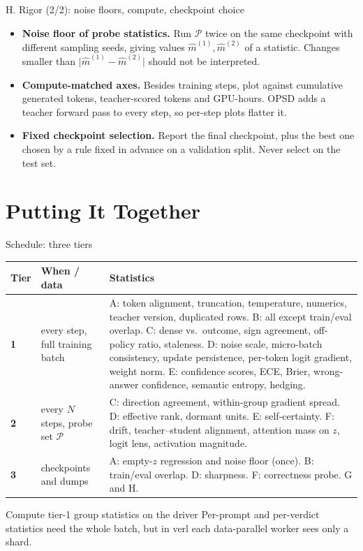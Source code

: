 \documentclass[aspectratio=169,11pt]{beamer}
\newcommand{\abs}[1]{\lvert #1\rvert}
\begin{document}
\begin{frame}{H. Rigor (2/2): noise floors, compute, checkpoint choice}
\begin{itemize}
  \item \textbf{Noise floor of probe statistics.} Run $\mathcal P$ twice on the same checkpoint with different sampling seeds, giving values $\hat m^{(1)},\hat m^{(2)}$ of a statistic. Changes smaller than $\abs{\hat m^{(1)}-\hat m^{(2)}}$ should not be interpreted.
  \item \textbf{Compute-matched axes.} Besides training steps, plot against cumulative generated tokens, teacher-scored tokens and GPU-hours. OPSD adds a teacher forward pass to every step, so per-step plots flatter it.
  \item \textbf{Fixed checkpoint selection.} Report the final checkpoint, plus the best one chosen by a rule fixed in advance on a validation split. Never select on the test set.
\end{itemize}
\end{frame}

\section{Putting It Together}

\begin{frame}{Schedule: three tiers}
\scriptsize
\setlength{\tabcolsep}{4pt}\renewcommand{\arraystretch}{1.15}
\begin{tabularx}{\linewidth}{@{}>{\bfseries}l >{\raggedright\arraybackslash}p{2.4cm} Y@{}}
\toprule
Tier & When / data & Statistics\\
 & every step, full training batch & A: token alignment, truncation, temperature, numerics, teacher version, duplicated rows.
B: all except train/eval overlap. C: dense vs.\ outcome, sign agreement, off-policy ratio, staleness.
D: noise scale, micro-batch consistency, update persistence, per-token logit gradient, weight norm.
E: confidence scores, ECE, Brier, wrong-answer confidence, semantic entropy, hedging.\\
2 & every $N$ steps, probe set $\mathcal P$ & C: direction agreement, within-group gradient spread. D: effective rank, dormant units.
E: self-certainty. F: drift, teacher--student alignment, attention mass on $z$, logit lens, activation magnitude.\\
3 & checkpoints and dumps & A: empty-$z$ regression and noise floor (once). B: train/eval overlap. D: sharpness. F: correctness probe. G and H.\\
\bottomrule
\end{tabularx}
\vspace{4pt}
\begin{alertblock}{Compute tier-1 group statistics on the driver}
\footnotesize Per-prompt and per-verdict statistics need the whole batch, but in verl each data-parallel worker sees only a shard.
\end{alertblock}
\end{frame}
\end{document}
